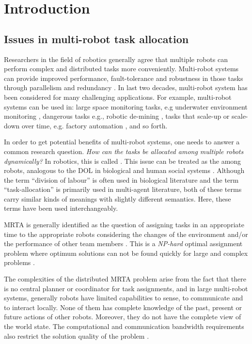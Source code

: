 \chapter{Introduction}
\label{intro}
\section{Issues in multi-robot task allocation}
\label{intro:mrta}
Researchers in the field of robotics generally agree that multiple robots can perform complex and distributed tasks more conveniently. Multi-robot systems can provide improved performance, fault-tolerance and robustness in those tasks through parallelism and redundancy \cite{Arkin1998,Parker+2006}. In last two decades, multi-robot system has been considered for many challenging applications. For example, multi-robot systems can be used in: large space monitoring tasks, e.g underwater environment monitoring \cite{Eriksen+2001}, dangerous tasks e.g., robotic de-mining \cite{Dunbar+2002}, tasks that scale-up or scale-down over time, e.g. factory automation \cite{Wurman+2008}, and so forth.

In order to get potential benefits of multi-robot systems,  one needs to answer a common research question. \textit{How can the tasks be allocated among multiple robots dynamically?} In robotics, this is called  \cite{Gerkey+2004}. This issue can be treated as the  among robots, analogous to the DOL in biological and human social systems \cite{Sendova-Franks+1999}. Although the term ``division of labour'' is often used in biological literature and the term ``task-allocation'' is primarily used in multi-agent literature, both of these terms carry similar kinds of meanings with slightly different semantics. Here, these terms have been used interchangeably.

MRTA is generally identified as the question of assigning tasks in an appropriate time to the appropriate robots considering the changes of the environment and/or the performance of other team members \cite{Gerkey+2003}. This is a {\em NP-hard} optimal assignment problem where optimum solutions can not be found quickly for large and complex problems \cite{Parker2008}.

The complexities of the distributed MRTA problem arise from the fact that there is no central planner or coordinator for task assignments, and in large multi-robot systems, generally robots have limited capabilities to sense, to communicate and to interact locally. None of them has complete knowledge of the past, present or future actions of other robots. Moreover, they do not have the complete view of the world state. The computational and communication bandwidth requirements also restrict the solution quality of the problem \cite{Gerkey+2004}.

